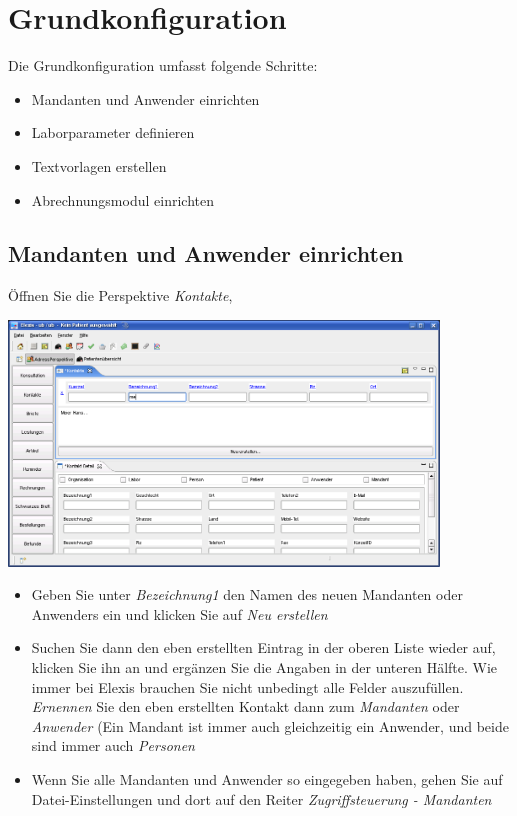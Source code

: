 \section{Grundkonfiguration}
\label{grundkonfiguration}
Die Grundkonfiguration umfasst folgende Schritte:
\begin{itemize}
  \item Mandanten und Anwender einrichten
  \item Laborparameter definieren
  \item Textvorlagen erstellen
  \item Abrechnungsmodul einrichten
\end{itemize}
\subsection{Mandanten und Anwender einrichten}
Öffnen Sie die Perspektive \textit{Kontakte},

\includegraphics[width=4.5in]{images/grundkonfkonta.png}
\begin{itemize}
 \item Geben Sie unter \textit{Bezeichnung1} den Namen des neuen Mandanten oder Anwenders ein und klicken Sie auf \textit{Neu erstellen}
 \item Suchen Sie dann den eben erstellten Eintrag in der oberen Liste wieder auf, klicken Sie ihn an und ergänzen Sie die Angaben in der unteren Hälfte. Wie immer bei Elexis brauchen Sie nicht unbedingt alle Felder auszufüllen. \textit{Ernennen} Sie den eben erstellten Kontakt dann zum \textit{Mandanten} oder \textit{Anwender} (Ein Mandant ist immer auch gleichzeitig ein Anwender, und beide sind immer auch \textit{Personen}
 \item Wenn Sie alle Mandanten und Anwender so eingegeben haben, gehen Sie auf Datei-Einstellungen und dort auf den Reiter \textit{Zugriffsteuerung - Mandanten}
\end{itemize}

